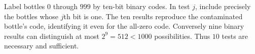 Label bottles $0$ through $999$ by ten-bit binary codes. In test $j$, include precisely the bottles whose $j$th bit is one. The ten results reproduce the contaminated bottle's code, identifying it even for the all-zero code. Conversely nine binary results can distinguish at most $2^9=512<1000$ possibilities. Thus $\boxed{10}$ tests are necessary and sufficient.
